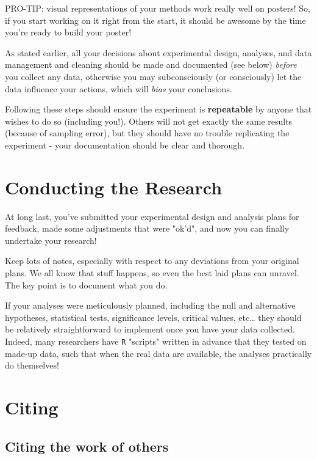 \documentclass[
]{book}
\begin{document}
PRO-TIP: visual representations of your methods work really well on posters! So, if you start working on it right from the start, it should be awesome by the time you're ready to build your poster!

As stated earlier, all your decisions about experimental design, analyses, and data management and cleaning should be made and documented (see below) \emph{before} you collect any data, otherwise you may subconsciously (or consciously) let the data influence your actions, which will \emph{bias} your conclusions.

Following these steps should ensure the experiment is \textbf{repeatable} by anyone that wishes to do so (including you!). Others will not get exactly the same results (because of sampling error), but they should have no trouble replicating the experiment - your documentation should be clear and thorough.

\hypertarget{conducting-the-research}{%
\section*{Conducting the Research}\label{conducting-the-research}}

At long last, you've submitted your experimental design and analysis plans for feedback, made some adjustments that were "ok'd", and now you can finally undertake your research!

Keep lots of notes, especially with respect to any deviations from your original plans. We all know that stuff happens, so even the best laid plans can unravel. The key point is to document what you do.

If your analyses were meticulously planned, including the null and alternative hypotheses, statistical tests, significance levels, critical values, etc\ldots{} they should be relatively straightforward to implement once you have your data collected. Indeed, many researchers have \texttt{R} "scripts" written in advance that they tested on made-up data, such that when the real data are available, the analyses practically do themselves!

\hypertarget{citing}{%
\section*{Citing}\label{citing}}

\hypertarget{citing-the-work-of-others}{%
\subsection*{Citing the work of others}\label{citing-the-work-of-others}}
\end{document}
